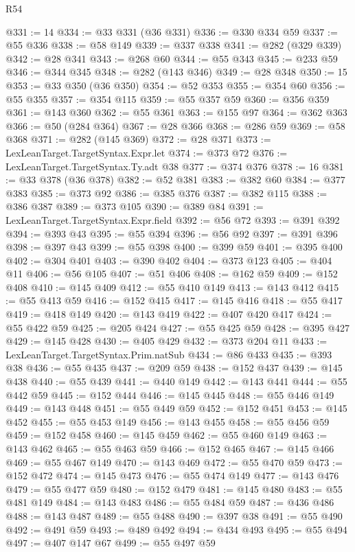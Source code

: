\begin{lexlean}{R54}
\begin{coremodule}
@331 := 14
@334 := @33 @331 (@36 @331)
@336 := @330 @334 @59
@337 := @55 @336
@338 := @58 @149
@339 := @337 @338
@341 := @282 (@329 @339)
@342 := @28 @341
@343 := @268 @60
@344 := @55 @343
@345 := @233 @59
@346 := @344 @345
@348 := @282 (@143 @346)
@349 := @28 @348
@350 := 15
@353 := @33 @350 (@36 @350)
@354 := @52 @353
@355 := @354 @60
@356 := @55 @355
@357 := @354 @115
@359 := @55 @357 @59
@360 := @356 @359
@361 := @143 @360
@362 := @55 @361
@363 := @155 @97
@364 := @362 @363
@366 := @50 (@284 @364)
@367 := @28 @366
@368 := @286 @59
@369 := @58 @368
@371 := @282 (@145 @369)
@372 := @28 @371
@373 := LexLeanTarget.TargetSyntax.Expr.let
@374 := @373 @72
@376 := LexLeanTarget.TargetSyntax.Ty.adt @38
@377 := @374 @376
@378 := 16
@381 := @33 @378 (@36 @378)
@382 := @52 @381
@383 := @382 @60
@384 := @377 @383
@385 := @373 @92
@386 := @385 @376
@387 := @382 @115
@388 := @386 @387
@389 := @373 @105
@390 := @389 @84
@391 := LexLeanTarget.TargetSyntax.Expr.field
@392 := @56 @72
@393 := @391 @392
@394 := @393 @43
@395 := @55 @394
@396 := @56 @92
@397 := @391 @396
@398 := @397 @43
@399 := @55 @398
@400 := @399 @59
@401 := @395 @400
@402 := @304 @401
@403 := @390 @402
@404 := @373 @123
@405 := @404 @11
@406 := @56 @105
@407 := @51 @406
@408 := @162 @59
@409 := @152 @408
@410 := @145 @409
@412 := @55 @410 @149
@413 := @143 @412
@415 := @55 @413 @59
@416 := @152 @415
@417 := @145 @416
@418 := @55 @417
@419 := @418 @149
@420 := @143 @419
@422 := @407 @420 @417
@424 := @55 @422 @59
@425 := @205 @424
@427 := @55 @425 @59
@428 := @395 @427
@429 := @145 @428
@430 := @405 @429
@432 := @373 @204 @11
@433 := LexLeanTarget.TargetSyntax.Prim.natSub
@434 := @86 @433
@435 := @393 @38
@436 := @55 @435
@437 := @209 @59
@438 := @152 @437
@439 := @145 @438
@440 := @55 @439
@441 := @440 @149
@442 := @143 @441
@444 := @55 @442 @59
@445 := @152 @444
@446 := @145 @445
@448 := @55 @446 @149
@449 := @143 @448
@451 := @55 @449 @59
@452 := @152 @451
@453 := @145 @452
@455 := @55 @453 @149
@456 := @143 @455
@458 := @55 @456 @59
@459 := @152 @458
@460 := @145 @459
@462 := @55 @460 @149
@463 := @143 @462
@465 := @55 @463 @59
@466 := @152 @465
@467 := @145 @466
@469 := @55 @467 @149
@470 := @143 @469
@472 := @55 @470 @59
@473 := @152 @472
@474 := @145 @473
@476 := @55 @474 @149
@477 := @143 @476
@479 := @55 @477 @59
@480 := @152 @479
@481 := @145 @480
@483 := @55 @481 @149
@484 := @143 @483
@486 := @55 @484 @59
@487 := @436 @486
@488 := @143 @487
@489 := @55 @488
@490 := @397 @38
@491 := @55 @490
@492 := @491 @59
@493 := @489 @492
@494 := @434 @493
@495 := @55 @494
@497 := @407 @147 @67
@499 := @55 @497 @59

\end{coremodule}
\end{lexlean}
